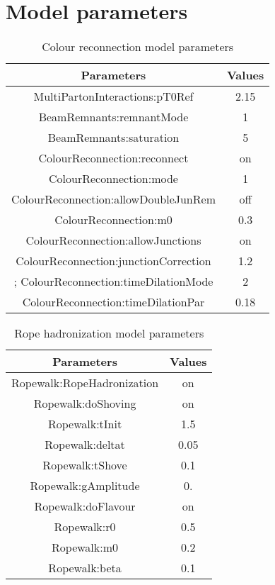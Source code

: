 \documentclass[ALICE,manyauthors]{StrinJet}
\begin{document}




\newpage
\appendix
\section{Model parameters}
\label{app:modpara}

\begin{table}[ht]
\label{tab:CRparameter}
  \begin{center}
  \begin{tabular}{|c|c|}
	\hline
	  Parameters & Values \\
	\hline 
	MultiPartonInteractions:pT0Ref &  2.15\\ 
	BeamRemnants:remnantMode & 1 \\
	BeamRemnants:saturation & 5 \\
	ColourReconnection:reconnect & on \\
	ColourReconnection:mode & 1 \\
	ColourReconnection:allowDoubleJunRem & off \\
	ColourReconnection:m0 & 0.3  \\
	ColourReconnection:allowJunctions & on \\
	ColourReconnection:junctionCorrection & 1.2 \\;
	ColourReconnection:timeDilationMode & 2 \\
	ColourReconnection:timeDilationPar & 0.18\\ 
	\hline 
  \end{tabular} 
  \caption{Colour reconnection model parameters}
  \end{center}
\end{table}

\begin{table}[ht]
	\label{tab:Ropeparameter}
	\begin{center}
		\begin{tabular}{|c|c|}
			\hline
			Parameters & Values \\
			\hline 
			Ropewalk:RopeHadronization & on \\
			Ropewalk:doShoving & on  \\
			Ropewalk:tInit & 1.5 \\
			Ropewalk:deltat & 0.05 \\
			Ropewalk:tShove & 0.1 \\
			Ropewalk:gAmplitude & 0. \\
			Ropewalk:doFlavour & on \\
			Ropewalk:r0 & 0.5 \\
			Ropewalk:m0 & 0.2 \\
			Ropewalk:beta & 0.1 \\
			\hline 
		\end{tabular} 
		\caption{Rope hadronization model parameters}
	\end{center}
\end{table}
 
\end{document}
